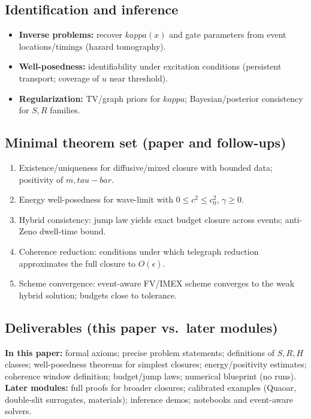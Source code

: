 \documentclass[12pt]{article}
\newcommand{\FoldTime}{\bar{\tau}}
\newcommand{\Threshold}{\kappa}
\newcommand{\Survival}{S}
\newcommand{\Release}{R}
\def\FoldTime{tau-bar}%
\def\Threshold{kappa}%
\def\Survival{S}%
\def\Release{R}%
\def\bar#1{#1}%
\begin{document}
\subsection{Identification and inference}
\begin{itemize}
  \item \textbf{Inverse problems:} recover $\Threshold(x)$ and gate parameters from event locations/timings (hazard tomography).
  \item \textbf{Well-posedness:} identifiability under excitation conditions (persistent transport; coverage of $u$ near threshold).
  \item \textbf{Regularization:} TV/graph priors for $\Threshold$; Bayesian/posterior consistency for $\Survival,\Release$ families.
\end{itemize}

\subsection{Minimal theorem set (paper and follow-ups)}
\begin{enumerate}
  \item Existence/uniqueness for diffusive/mixed closure with bounded data; positivity of $m,\FoldTime$.
  \item Energy well-posedness for wave-limit with $0\le c^2\le c_0^2$, $\gamma\ge 0$.
  \item Hybrid consistency: jump law yields exact budget closure across events; anti-Zeno dwell-time bound.
  \item Coherence reduction: conditions under which telegraph reduction approximates the full closure to $O(\epsilon)$.
  \item Scheme convergence: event-aware FV/IMEX scheme converges to the weak hybrid solution; budgets close to tolerance.
\end{enumerate}

\subsection{Deliverables (this paper vs.\ later modules)}
\textbf{In this paper:} formal axioms; precise problem statements; definitions of $\Survival,\Release,H$ classes; well-posedness theorems for simplest closures; energy/positivity estimates; coherence window definition; budget/jump laws; numerical blueprint (no runs).\\
\textbf{Later modules:} full proofs for broader closures; calibrated examples (Quaoar, double-slit surrogates, materials); inference demos; notebooks and event-aware solvers.
\end{document}
